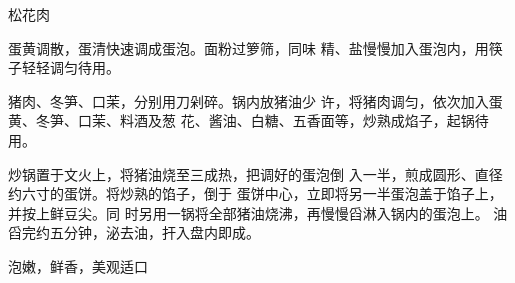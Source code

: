 \begin{recipe}{松花肉}

\ingredients


\cooking

\step 	蛋黄调散，蛋清快速调成蛋泡。面粉过箩筛，同味 精、盐慢慢加入蛋泡内，用筷子轻轻调匀待用。

\step 	猪肉、冬笋、口茉，分别用刀剁碎。锅内放猪油少 许，将猪肉调匀，依次加入蛋黄、冬笋、口茉、料酒及葱 花、酱油、白糖、五香面等，炒熟成焰子，起锅待用。

\step 炒锅置于文火上，将猪油烧至三成热，把调好的蛋泡倒 入一半，煎成圆形、直径约六寸的蛋饼。将炒熟的馅子，倒于 蛋饼中心，立即将另一半蛋泡盖于馅子上，并按上鲜豆尖。同 时另用一锅将全部猪油烧沸，再慢慢舀淋入锅内的蛋泡上。 油舀完约五分钟，泌去油，扞入盘内即成。

\notes

泡嫩，鲜香，美观适口

\end{recipe}

